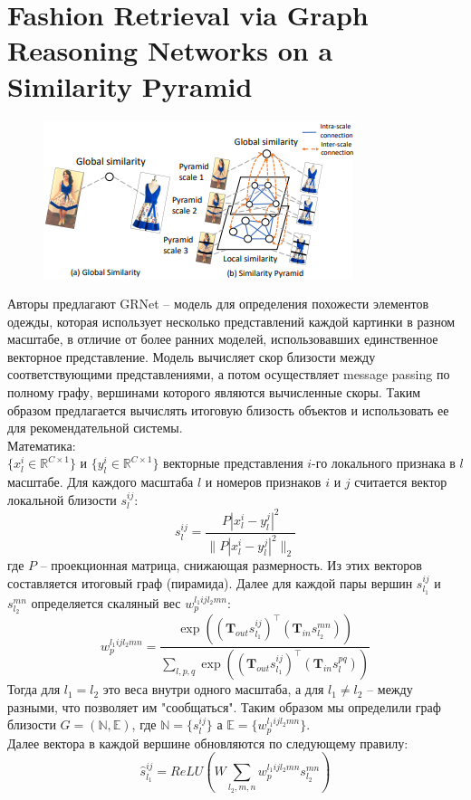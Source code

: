 \documentclass[a4paper,12pt]{article}
\begin{document}
\section{Fashion Retrieval via Graph Reasoning Networks on a Similarity Pyramid}

\begin{figure}
	\includegraphics[scale = 1.1]{GRNet_intro.png}
\end{figure}
Авторы предлагают GRNet – модель для определения похожести элементов одежды, которая использует несколько представлений каждой картинки в разном масштабе, в отличие от более ранних моделей, использовавших единственное векторное представление. Модель вычисляет скор близости между соответствующими представлениями, а потом осуществляет message passing по полному графу, вершинами которого являются вычисленные скоры. Таким образом предлагается вычислять итоговую близость объектов и использовать ее для рекомендательной системы.\\

Математика:\\
$\{x_l^i \in \mathbb{R}^{C\times 1}\}$ и $\{y_l^i \in \mathbb{R}^{C\times 1}\}$ векторные представления $i$-го локального признака в $l$ масштабе. Для каждого масштаба $l$ и номеров признаков $i$ и $j$ считается вектор локальной близости $s_l^{ij}$:
$$s_l^{ij} = \frac{P|x_l^i-y_l^j|^2}{\|P|x_l^i-y_l^j|^2\|_2}$$
где $P$ -- проекционная матрица, снижающая размерность. Из этих векторов составляется итоговый граф (пирамида). Далее для каждой пары вершин $s_{l_1}^{ij}$ и $s_{l_2}^{mn}$ определяется скаляный вес $w_p^{l_1ijl_2mn}$:
$$w_p^{l_1ijl_2mn} = \frac{\exp((\mathbf{T}_{out}s_{l_1}^{ij})^\intercal(\mathbf{T}_{in}s_{l_2}^{mn}))}{\sum\limits_{l,p,q}\exp((\mathbf{T}_{out}s_{l_1}^{ij})^\intercal(\mathbf{T}_{in}s_{l}^{pq}))}$$ 
Тогда для $l_1=l_2$ это веса внутри одного масштаба, а для $l_1\neq l_2$ -- между разными, что позволяет им "сообщаться". Таким образом мы определили граф близости $G = (\mathbb{N},\mathbb{E})$, где $\mathbb{N} = \{s_l^{ij}\}$ а $\mathbb{E} = \{w_p^{l_1ijl_2mn}\}$.\\
Далее вектора в каждой вершине обновляются по следующему правилу:
$$\widehat{s}_{l_1}^{ij} =ReLU\left(W \sum\limits_{l_2,m,n}w_p^{l_1ijl_2mn}s_{l_2}^{mn}\right)$$
\end{document}
